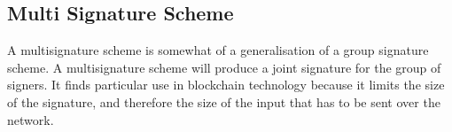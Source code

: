 \documentclass[12pt]{report}
\theoremstyle{plain}
\theoremstyle{definition}
\begin{document}
	\subsection{Multi Signature Scheme}
	A multisignature scheme is somewhat of a generalisation of a group signature scheme. A multisignature scheme will produce a joint signature for the group of signers. It finds particular use in blockchain technology because it limits the size of the signature, and therefore the size of the input that has to be sent over the network.
\end{document}
